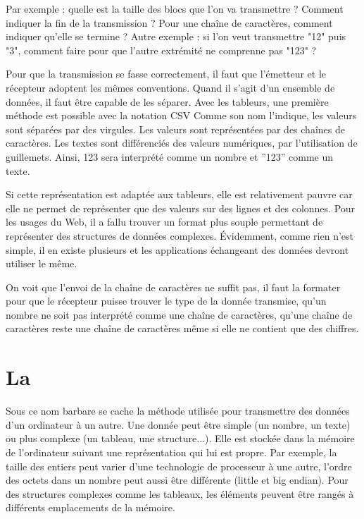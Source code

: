 Par exemple : quelle est la taille des blocs que l’on va transmettre ? Comment indiquer la fin de la transmission ? Pour une chaîne de caractères, comment indiquer qu’elle se termine ? Autre exemple : si l'on veut transmettre "12" puis "3", comment faire pour que l'autre extrémité ne comprenne pas "123" ?

     \vspace{1em}


Pour que la transmission se fasse correctement, il faut que l’émetteur et le récepteur adoptent les mêmes conventions. Quand il s’agit d’un ensemble de données, il faut être capable de les séparer. Avec les tableurs, une première méthode est possible avec la notation \ac{CSV} Comme son nom l’indique, les valeurs sont séparées par des virgules. Les valeurs sont représentées par des chaînes de caractères. Les textes sont différenciés des valeurs numériques, par l’utilisation de guillemets. Ainsi, 123 sera interprété comme un nombre et ”123” comme un texte.

Si cette représentation est adaptée aux tableurs, elle est relativement pauvre car elle ne permet de représenter que des valeurs sur des lignes et des colonnes. Pour les usages du Web, il a fallu trouver un format plus souple permettant de représenter des structures de données complexes. Évidemment, comme rien n'est simple, il en existe plusieurs et les applications échangeant des données devront utiliser le même.

     \vspace{1em}


On voit que l'envoi de la chaîne de caractères ne suffit pas, il faut la formater pour que le récepteur puisse trouver le type de la donnée transmise, qu'un nombre ne soit pas interprété comme une chaîne de caractères, qu'une chaîne de caractères reste une chaîne de caractères même si elle ne contient que des chiffres.   
    \vspace{1em}
   
\section{La }

Sous ce nom barbare se cache la méthode utilisée pour transmettre 
des données d’un ordinateur à un autre.
Une donnée peut être simple
(un nombre, un texte) ou plus complexe (un tableau, une structure...). 
Elle est stockée dans la mémoire de l'ordinateur suivant une représentation qui lui est propre. Par exemple, la taille des entiers peut varier d'une technologie de processeur à une autre, l'ordre des octets dans un nombre peut aussi être différente (little et big endian). 
Pour des structures complexes comme les tableaux, les éléments peuvent être rangés à différents emplacements de la mémoire. 

